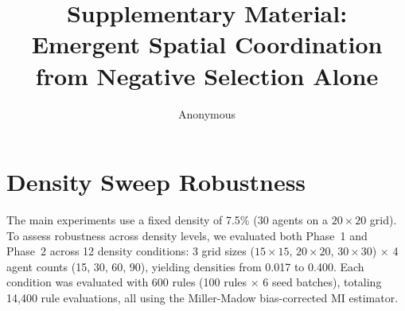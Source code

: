 \documentclass[letterpaper]{article}
\title{Supplementary Material:\\
Emergent Spatial Coordination from Negative Selection Alone}
\author{Anonymous}
\begin{document}
\maketitle
{}

\section{Density Sweep Robustness}
\label{app:density_sweep}

The main experiments use a fixed density of 7.5\% (30 agents on a
$20 \times 20$ grid). To assess robustness across density levels, we
evaluated both Phase~1 and Phase~2 across 12 density conditions: 3 grid
sizes ($15 \times 15$, $20 \times 20$, $30 \times 30$) $\times$ 4 agent
counts (15, 30, 60, 90), yielding densities from 0.017 to 0.400.
Each condition was evaluated with 600 rules (100 rules $\times$ 6 seed
batches), totaling 14{,}400 rule evaluations, all using the Miller-Madow
bias-corrected MI estimator.
\end{document}
